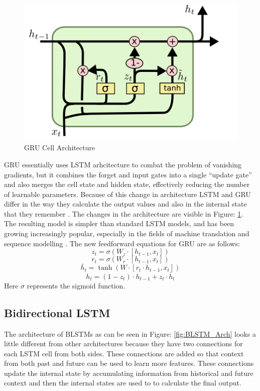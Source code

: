 \documentclass[letterpaper, 12 pt, conference]{ieeeconf}  %
\begin{document}
\begin{figure}[!h]
\centering
\includegraphics[scale=0.50]{../figs/gru/diagram.png}	
\caption{GRU Cell Architecture}
\label{fig:GRU_Arch} 
\end{figure}

GRU essentially uses LSTM arhcitecture to combat the problem of vanishing gradients, but it combines the forget and input gates into a single “update gate” and also merges the cell state and hidden state, effectively reducing the number of learnable parameters. Because of this change in architecture LSTM and GRU differ in the way they calculate the output values and also in the internal state that they remember \cite{gru_evaluation}. The changes in the architecture are visible in Figure: \ref{fig:GRU_Arch}. The resulting model is simpler than standard LSTM models, and has been growing increasingly popular, especially in the fields of machine translation \cite{gru_translation} and sequence modelling \cite{gru_evaluation}. The new feedforward equations for GRU are as follows:
\begin{equation}
z_t = \sigma(W_z \cdot [h_{t-1}, x_t])
\end{equation}
\begin{equation}
r_t = \sigma(W_r \cdot [h_{t-1}, x_t])
\end{equation}
\begin{equation}
\bar{h}_t = \tanh(W \cdot [r_t \cdot h_{t-1}, x_t])
\end{equation}
\begin{equation}
h_t = (1 - z_t) \cdot h_{t-1} + z_t \cdot \bar{h}_{t}
\end{equation}
Here $\sigma$ represents the sigmoid function.


\subsection{Bidirectional LSTM}
The architecture of BLSTMs as can be seen in Figure: \ref{fig:BLSTM_Arch} looks a little different from other architectures because they have two connections for each LSTM cell from both sides. These connections are added so that context from both past and future can be used to learn more features. These connections update the internal state by accumulating information from historical and future context and then the internal states are used to to calculate the final output.
\end{document}
